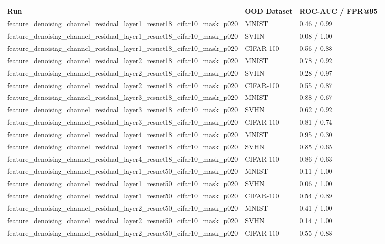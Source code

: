 \begin{tabular}{lll}
\toprule
Run & OOD Dataset & ROC-AUC / FPR@95 \\
\midrule
feature\_denoising\_channel\_residual\_layer1\_resnet18\_cifar10\_mask\_p020 & MNIST & 0.46 / 0.99 \\
feature\_denoising\_channel\_residual\_layer1\_resnet18\_cifar10\_mask\_p020 & SVHN & 0.08 / 1.00 \\
feature\_denoising\_channel\_residual\_layer1\_resnet18\_cifar10\_mask\_p020 & CIFAR-100 & 0.56 / 0.88 \\
feature\_denoising\_channel\_residual\_layer2\_resnet18\_cifar10\_mask\_p020 & MNIST & 0.78 / 0.92 \\
feature\_denoising\_channel\_residual\_layer2\_resnet18\_cifar10\_mask\_p020 & SVHN & 0.28 / 0.97 \\
feature\_denoising\_channel\_residual\_layer2\_resnet18\_cifar10\_mask\_p020 & CIFAR-100 & 0.55 / 0.87 \\
feature\_denoising\_channel\_residual\_layer3\_resnet18\_cifar10\_mask\_p020 & MNIST & 0.88 / 0.67 \\
feature\_denoising\_channel\_residual\_layer3\_resnet18\_cifar10\_mask\_p020 & SVHN & 0.62 / 0.92 \\
feature\_denoising\_channel\_residual\_layer3\_resnet18\_cifar10\_mask\_p020 & CIFAR-100 & 0.81 / 0.74 \\
feature\_denoising\_channel\_residual\_layer4\_resnet18\_cifar10\_mask\_p020 & MNIST & 0.95 / 0.30 \\
feature\_denoising\_channel\_residual\_layer4\_resnet18\_cifar10\_mask\_p020 & SVHN & 0.85 / 0.65 \\
feature\_denoising\_channel\_residual\_layer4\_resnet18\_cifar10\_mask\_p020 & CIFAR-100 & 0.86 / 0.63 \\
feature\_denoising\_channel\_residual\_layer1\_resnet50\_cifar10\_mask\_p020 & MNIST & 0.11 / 1.00 \\
feature\_denoising\_channel\_residual\_layer1\_resnet50\_cifar10\_mask\_p020 & SVHN & 0.06 / 1.00 \\
feature\_denoising\_channel\_residual\_layer1\_resnet50\_cifar10\_mask\_p020 & CIFAR-100 & 0.54 / 0.89 \\
feature\_denoising\_channel\_residual\_layer2\_resnet50\_cifar10\_mask\_p020 & MNIST & 0.41 / 1.00 \\
feature\_denoising\_channel\_residual\_layer2\_resnet50\_cifar10\_mask\_p020 & SVHN & 0.14 / 1.00 \\
feature\_denoising\_channel\_residual\_layer2\_resnet50\_cifar10\_mask\_p020 & CIFAR-100 & 0.55 / 0.88 \\

\end{tabular}
